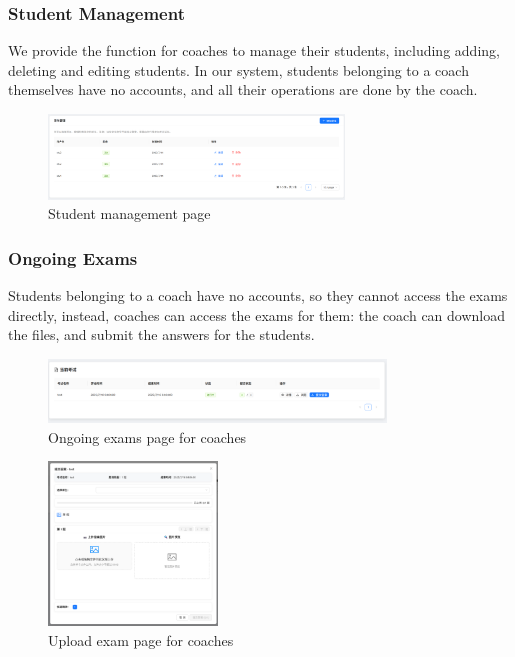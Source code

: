\documentclass[12pt]{article}
\begin{document}
\subsubsection{Student Management}
We provide the function for coaches to manage their students, including adding, deleting and editing students.
In our system, students belonging to a coach themselves have no accounts, and all their operations are done by the coach.
\begin{figure}[H]
    \centering
    \includegraphics[width=0.7\textwidth]{coach/stu-manage.png}
    \caption{Student management page}
    \label{fig:StudentManagement page}
\end{figure}
\subsubsection{Ongoing Exams}
Students belonging to a coach have no accounts, so they cannot access the exams directly, instead, coaches can access the exams
for them: the coach can download the files, and submit the answers for the students.
\begin{figure}[H]
    \centering
    \includegraphics[width=0.8\textwidth]{coach/test-ing.png}
    \caption{Ongoing exams page for coaches}
    \label{fig:OngoingExamsForCoach page}
\end{figure}
\begin{figure}[H]
    \centering
    \includegraphics[width=0.4\textwidth]{coach/uploadexam.png}
    \caption{Upload exam page for coaches}
    \label{fig:UploadExamForCoach page}
\end{figure}
\end{document}
